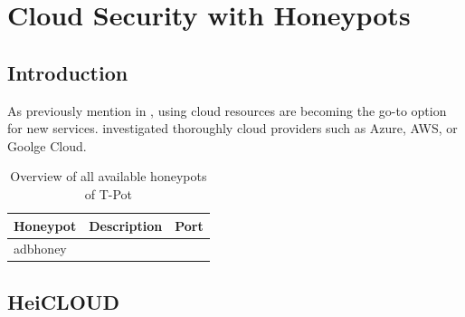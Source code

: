 \chapter{Cloud Security with Honeypots}

\section{Introduction}


As previously mention in , using cloud resources are becoming the go-to option for new services.
\citet{Kelly2021} investigated thoroughly cloud providers such as Azure, AWS, or Goolge Cloud. 


\begin{table}[h]
    \centering
    \caption{Overview of all available honeypots of T-Pot}
    \begin{tabularx}{\linewidth}{l|l|l}
        \toprule
        \textbf{Honeypot}                                 & \textbf{Description} & \textbf{Port} \\
        \hline
        adbhoney                                 &             &      \\
        \bottomrule
    \end{tabularx}
    \label{tab:overview-cloud-security}
\end{table}

\section{HeiCLOUD}

